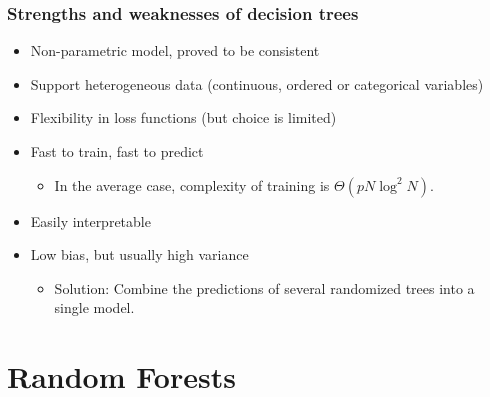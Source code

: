 \documentclass{beamer}
\begin{document}
\begin{frame}
  \frametitle{Strengths and weaknesses of decision trees}

  \begin{itemize}
    \item {\color{blue} Non-parametric} model, proved to be {\color{blue} consistent}

    \vspace{0.25cm}

    \item Support {\color{blue} heterogeneous} data (continuous, ordered or
          categorical variables)

    \vspace{0.25cm}

    \item {\color{blue}Flexibility} in loss functions (but choice is
          {\color{red}limited})

    \vspace{0.25cm}

    \item {\color{blue} Fast} to train, {\color{blue} fast} to predict
        \begin{itemize}
            \item In the average case, complexity of training is $\Theta(pN\log^2 N)$.
        \end{itemize}

    \vspace{0.25cm}

    \item Easily {\color{blue} interpretable}

    \vspace{0.25cm}

    \item {\color{blue} Low bias}, but usually {\color{red} high variance}\\
        \begin{itemize}
            \item Solution: Combine the predictions of several randomized
                  trees into a single model.
        \end{itemize}
  \end{itemize}
\end{frame}



\section{Random Forests}
\end{document}
